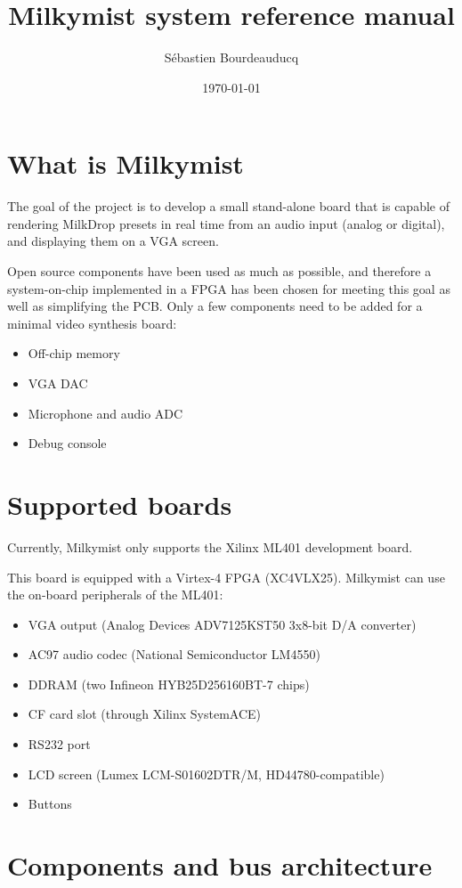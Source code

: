 \documentclass[a4paper,11pt]{article}
\title{Milkymist system reference manual}
\author{S\'ebastien Bourdeauducq}
\date{\today}
\begin{document}
\maketitle{}
\section{What is Milkymist}
The goal of the project is to develop a small stand-alone board that is capable of rendering MilkDrop presets in real time from an audio input (analog or digital), and displaying them on a VGA screen.

Open source components have been used as much as possible, and therefore a system-on-chip implemented in a FPGA has been chosen for meeting this goal as well as simplifying the PCB. Only a few components need to be added for a minimal video synthesis board:
\begin{itemize}
\item Off-chip memory
\item VGA DAC
\item Microphone and audio ADC
\item Debug console
\end{itemize}

\section{Supported boards}
Currently, Milkymist only supports the Xilinx ML401 development board.

This board is equipped with a Virtex-4 FPGA (XC4VLX25). Milkymist can use the on-board peripherals of the ML401:
\begin{itemize}
\item VGA output (Analog Devices ADV7125KST50 3x8-bit D/A converter)
\item AC97 audio codec (National Semiconductor LM4550)
\item DDRAM (two Infineon HYB25D256160BT-7 chips)
\item CF card slot (through Xilinx SystemACE)
\item RS232 port
\item LCD screen (Lumex LCM-S01602DTR/M, HD44780-compatible)
\item Buttons
\end{itemize}

\section{Components and bus architecture}
\end{document}
